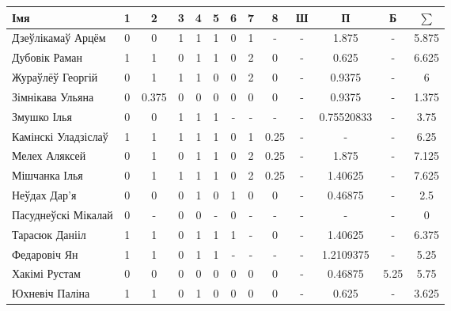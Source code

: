\begin{table}[H]
	\begin{minipage}{\textwidth}
		\begin{tabular}{|l|c|c|c|c|c|c|c|c|c|c|c|c|}
			\hline
			Імя                 &  1   & 2 & 3 &   4   &  5   & 6 &  7   &  8   &   Ш   & П &  Б   & $\sum$ \\ \hline
			Дзеўлікамаў Арцём   & 0    & 0 & 1 & 1 & 1 & 0  & 1    &  -   & -  & 1.875 & -    &  5.875 \\ \hline
			Дубовік Раман       &  1   & 1 & 0 & 1 & 1    & 0 & 2    & 0    & -     & 0.625 & -    &  6.625 \\ \hline
			Жураўлёў Георгій    &  0   & 1 & 1 & 1  & 0    & 0 & 2 & 0    & -     & 0.9375 &  -   &   6  \\ \hline
			Зімнікава Ульяна    &  0   & 0.375 & 0 & 0  & 0    & 0 & 0    & 0    &  -    & 0.9375 &  -   & 1.375 \\ \hline
			Змушко Ілья         &  0   & 0 & 1 & 1  & 1    & - & - & -    & - & 0.75520833 & - &  3.75 \\ \hline
			Камінскі Уладзіслаў &  1   & 1 & 1 &   1   &  1   & 0 &  1   &  0.25   &   -   & - &  -   &   6.25    \\ \hline
			Мелех Аляксей       &  0   & 1 & 0 & 1  & 1    & 0 & 2    & 0.25 &  -   &  1.875 & -  &   7.125  \\ \hline
			Мішчанка Ілья       &  0   & 1 & 1 & 1     & 1    & 0  & 2 & 0.25    & -  & 1.40625 & -    &   7.625    \\ \hline
			Неўдах Дар'я        &  0   & 0 & 0 & 1 & 0 & 1 & 0 & 0 & -     & 0.46875 &  -   & 2.5      \\ \hline
			Пасуднеўскі Мікалай & 0  & - & 0 &  0    &  -   & 0 &  -   &  -   &  -    & - & -    &  0  \\ \hline
			Тарасюк Данііл      &   1  & 1 & 0 &  1    &  1   & 1 & - &  0   & - & 1.40625 &  -   &  6.375 \\ \hline
			Федаровіч Ян        &  1   & 1 & 0 &   1   &  1   & - &  -   &  -   &   -   & 1.2109375 &  -   &   5.25    \\ \hline
			Хакімі Рустам       &  0   & 0 & 0 &  0 & 0 & 0 & 0    &  0   &   -   & 0.46875 &  5.25   &  5.75    \\ \hline
			Юхневіч Паліна      &  1   & 1 & 0 &  1    & 0 & 0 & 0 & 0 &  -    & 0.625 &  -  &  3.625  \\ \hline
		\end{tabular}
	\end{minipage}
\end{table}


